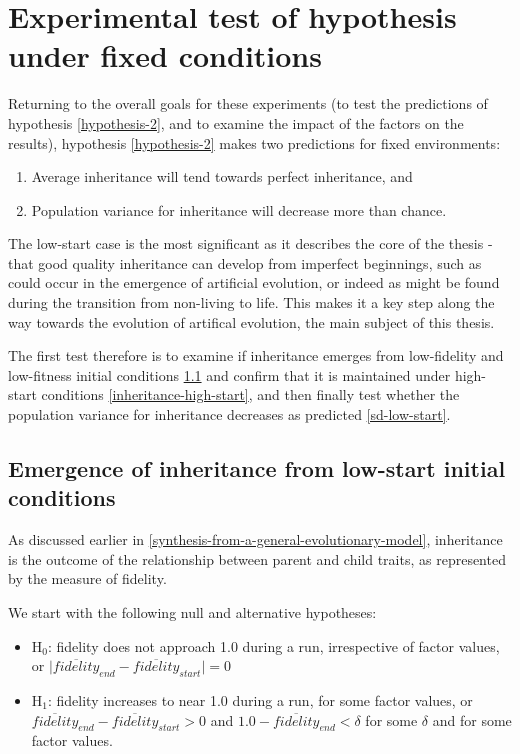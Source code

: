 \chapter[Test under fixed conditions]{Experimental test of hypothesis under fixed conditions}\label{experimental-test-of-h2-under-fixed-conditions}

Returning to the overall goals for these experiments (to test the predictions of hypothesis \autoref{hypothesis-2}, and to examine the impact of the factors on the results), hypothesis \autoref{hypothesis-2} makes two predictions for fixed environments:

\begin{enumerate}
	\item Average inheritance will tend towards perfect inheritance, and
	\item Population variance for inheritance will decrease more than chance.
\end{enumerate}

The low-start case is the most significant as it describes the core of the thesis - that good quality inheritance can develop from imperfect beginnings, such as could occur in the emergence of artificial evolution, or indeed as might be found during the transition from non-living to life. This makes it a key step along the way towards the evolution of artifical evolution, the main subject of this thesis.

The first test therefore is to examine if inheritance emerges from low-fidelity and low-fitness initial conditions \cref{inheritance-low-start} and confirm that it is maintained under high-start conditions \cref{inheritance-high-start}, and then finally test whether the population variance for inheritance decreases as predicted \cref{sd-low-start}.

\section{Emergence of inheritance from low-start initial conditions}\label{inheritance-low-start}

As discussed earlier in \cref{synthesis-from-a-general-evolutionary-model}, inheritance is the outcome of the relationship between parent and child traits, as represented by the measure of fidelity.


We start with the following null and alternative hypotheses:

\begin{itemize}[label={}]
	\item H$_0$: fidelity does not approach 1.0 during a run, irrespective of factor values, or \newline
 $\vert \overline{fidelity}_{end}-\overline{fidelity}_{start} \vert = 0$
	\item H$_1$: fidelity increases to near 1.0 during a run, for some factor values, or \newline
 $\overline{fidelity}_{end}-\overline{fidelity}_{start} > 0$ and $1.0-\overline{fidelity}_{end} < \delta$ for some $\delta$ and for some factor values.
\end{itemize}

